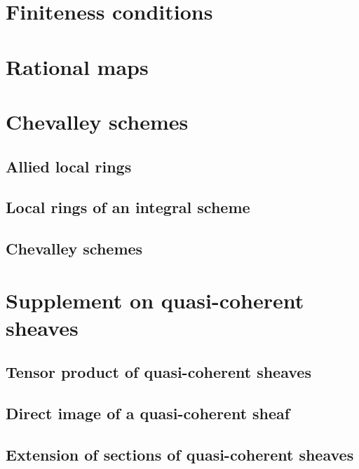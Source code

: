 \documentclass[10pt,oneside]{amsart}
\begin{document}
    \section{Finiteness conditions}

    \section{Rational maps}

    \section{Chevalley schemes}

        \subsection{Allied local rings}
        

        \subsection{Local rings of an integral scheme}
        

        \subsection{Chevalley schemes}
        

    \section{Supplement on quasi-coherent sheaves}

        \subsection{Tensor product of quasi-coherent sheaves}
        

        \subsection{Direct image of a quasi-coherent sheaf}
        
        
        \subsection{Extension of sections of quasi-coherent sheaves}
        
        
\end{document}
